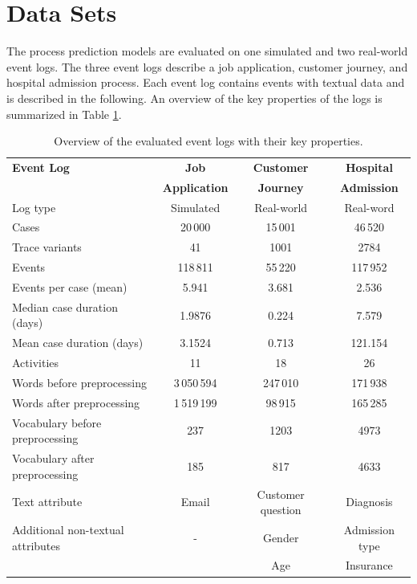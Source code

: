 \section{Data Sets}\label{sec:datasets}

The process prediction models are evaluated on one simulated and two real-world event logs.
The three event logs describe a job application, customer journey, and hospital admission process.
Each event log contains events with textual data and is described in the following.
An overview of the key properties of the logs is summarized in Table \ref{tab:logs}.

\begin{table}[!htbp]
	\setlength\tabcolsep{5pt}
	\begin{tabularx}{\textwidth}{l c c c}
		\toprule
		\textbf{Event Log} & \textbf{Job} & \textbf{Customer} & \textbf{Hospital}  \\
		& \textbf{Application} & \textbf{Journey} &\textbf{Admission}  \\
		\midrule
		Log type & Simulated & Real-world & Real-word\\
		Cases & 20\,000& 15\,001& 46\,520\\
		Trace variants &41 & 1001 &2784 \\
		Events & 118\,811 & 55\,220 & 117\,952\\
		Events per case (mean) & 5.941& 3.681& 2.536\\
		Median case duration (days) & 1.9876 & 0.224& 7.579\\
		Mean case duration (days)& 3.1524 &  0.713 & 121.154\\
		Activities & 11 & 18 & 26\\
		Words before preprocessing & 3\,050\,594 &247\,010 &  171\,938\\
		Words after preprocessing  &1\,519\,199 &98\,915 & 165\,285\\
		Vocabulary before preprocessing & 237 & 1203 & 4973 \\
		Vocabulary after preprocessing & 185 & 817 & 4633\\
		Text attribute & Email& Customer question & Diagnosis\\
		Additional non-textual attributes & - & Gender& Admission type\\
		&  & Age& Insurance\\
		\bottomrule
	\end{tabularx}
	\caption[Overview of the evaluated event logs]{Overview of the evaluated event logs with their key properties.}
	\label{tab:logs}
\end{table}

